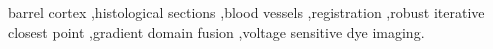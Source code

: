 \begin{keyword}
barrel cortex \sep histological sections \sep blood vessels \sep registration \sep robust iterative closest point \sep gradient domain fusion \sep voltage sensitive dye imaging.
\end{keyword}